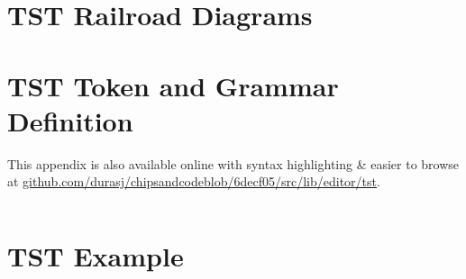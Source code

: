 \inputminted[breaklines=true,fontsize=\footnotesize]{text}{./assets/Xor.hdl}

\chapter{TST Railroad Diagrams}
\label{appendix:hdl-railroad}

\noindent


\vspace{20pt}

\noindent


\vspace{20pt}

\noindent


\vspace{20pt}

\noindent


\vspace{20pt}

\noindent


\vspace{20pt}

\noindent


\vspace{20pt}

\noindent


\vspace{20pt}

\noindent


\chapter{TST Token and Grammar Definition}
\label{appendix:tst-grammar}

This appendix is also available online with syntax highlighting \& easier to browse at \href{https://github.com/durasj/chipsandcode/blob/6decf05115ba1d4ca927de42f63c8431b1ac3124/src/lib/editor/tst/grammar.ne}{github.com/durasj/chipsandcodeblob/6decf05/src/lib/editor/tst}.

\inputminted[breaklines=true,fontsize=\footnotesize]{text}{./assets/tst.ne}

\chapter{TST Example}
\label{appendix:tst-example}

